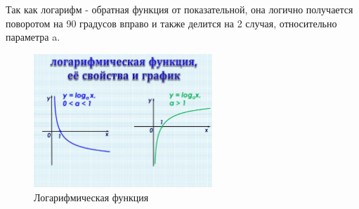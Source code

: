 Так как логарифм - обратная функция от показательной, она логично получается поворотом на 90 градусов вправо и также делится на 2 случая, относительно параметра a.

\begin{figure}[h!]
	\centering
	\includegraphics[width=0.6\textwidth]{img/log.jpg}
	\caption{Логарифмическая функция}
\end{figure}